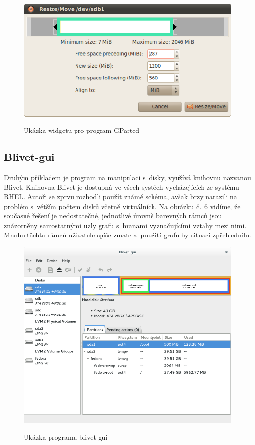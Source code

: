 \documentclass[color,table,oneside,nolot,nolof]{fithesis}
\begin{document}
 \begin{figure}[h!]
	 \label{fig:gparted}
	 \caption{Ukázka widgetu pro program GParted~\cite{GParted}}
	 \centering
	 \includegraphics[width=.6\columnwidth]{pictures/gparted-5-big.png}\\
 \end{figure}

 \subsection{Blivet-gui}

 Druhým příkladem je program na manipulaci s~disky, využívá knihovnu nazvanou Blivet. Knihovna Blivet je dostupná ve všech systéch vycházejících ze systému RHEL. Autoři 
 se zprvu rozhodli použít známé schéma, avšak brzy narazili na problém s~větším počtem disků včetně virtuálních. Na obrázku č.~6 vidíme, že současné řešení je nedostatečné, jednotlivé úrovně barevných rámců 
 jsou znázorněny samostatnými uzly grafu s~hranami vyznačujícími vztahy mezi nimi. Mnoho těchto rámců uživatele spíše zmate a~použití grafu by situaci zpřehlednilo.

 \begin{figure}[h!]
	 \label{fig:blivet}
	 \caption{Ukázka programu blivet-gui~\cite{blivet-gui}}
	 \centering
	 \includegraphics[width=.6\columnwidth]{pictures/blivet-gui-1.png}\\
 \end{figure}
\end{document}
